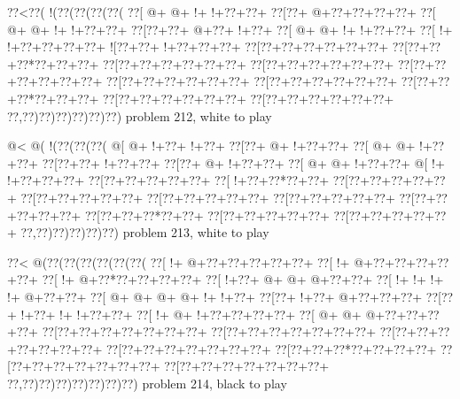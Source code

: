 \vbox{\vbox{\goo
\0??<\0??(\- !(\0??(\0??(\0??(\0??(
\0??[\- @+\- @+\- !+\- !+\0??+\0??+
\0??[\0??+\- @+\0??+\0??+\0??+\0??+
\0??[\- @+\- @+\- !+\- !+\0??+\0??+
\0??[\0??+\0??+\- @+\0??+\- !+\0??+
\0??[\- @+\- @+\- !+\- !+\0??+\0??+
\0??[\- !+\- !+\0??+\0??+\0??+\0??+
\- ![\0??+\0??+\- !+\0??+\0??+\0??+
\0??[\0??+\0??+\0??+\0??+\0??+\0??+
\0??[\0??+\0??+\0??*\0??+\0??+\0??+
\0??[\0??+\0??+\0??+\0??+\0??+\0??+
\0??[\0??+\0??+\0??+\0??+\0??+\0??+
\0??[\0??+\0??+\0??+\0??+\0??+\0??+
\0??[\0??+\0??+\0??+\0??+\0??+\0??+
\0??[\0??+\0??+\0??+\0??+\0??+\0??+
\0??[\0??+\0??+\0??*\0??+\0??+\0??+
\0??[\0??+\0??+\0??+\0??+\0??+\0??+
\0??[\0??+\0??+\0??+\0??+\0??+\0??+
\0??,\0??)\0??)\0??)\0??)\0??)\0??)
}
\hfil problem 212, white to play\hfil\break
}

\vbox{\vbox{\goo
\- @<\- @(\- !(\0??(\0??(\0??(
\- @[\- @+\- !+\0??+\- !+\0??+
\0??[\0??+\- @+\- !+\0??+\0??+
\0??[\- @+\- @+\- !+\0??+\0??+
\0??[\0??+\0??+\- !+\0??+\0??+
\0??[\0??+\- @+\- !+\0??+\0??+
\0??[\- @+\- @+\- !+\0??+\0??+
\- @[\- !+\- !+\0??+\0??+\0??+
\0??[\0??+\0??+\0??+\0??+\0??+
\0??[\- !+\0??+\0??*\0??+\0??+
\0??[\0??+\0??+\0??+\0??+\0??+
\0??[\0??+\0??+\0??+\0??+\0??+
\0??[\0??+\0??+\0??+\0??+\0??+
\0??[\0??+\0??+\0??+\0??+\0??+
\0??[\0??+\0??+\0??+\0??+\0??+
\0??[\0??+\0??+\0??*\0??+\0??+
\0??[\0??+\0??+\0??+\0??+\0??+
\0??[\0??+\0??+\0??+\0??+\0??+
\0??,\0??)\0??)\0??)\0??)\0??)
}
\hfil problem 213, white to play\hfil\break
}

\vbox{\vbox{\goo
\0??<\- @(\0??(\0??(\0??(\0??(\0??(\0??(
\0??[\- !+\- @+\0??+\0??+\0??+\0??+\0??+
\0??[\- !+\- @+\0??+\0??+\0??+\0??+\0??+
\0??[\- !+\- @+\0??*\0??+\0??+\0??+\0??+
\0??[\- !+\0??+\- @+\- @+\- @+\0??+\0??+
\0??[\- !+\- !+\- !+\- !+\- @+\0??+\0??+
\0??[\- @+\- @+\- @+\- @+\- !+\- !+\0??+
\0??[\0??+\- !+\0??+\- @+\0??+\0??+\0??+
\0??[\0??+\- !+\0??+\- !+\- !+\0??+\0??+
\0??[\- !+\- @+\- !+\0??+\0??+\0??+\0??+
\0??[\- @+\- @+\- @+\0??+\0??+\0??+\0??+
\0??[\0??+\0??+\0??+\0??+\0??+\0??+\0??+
\0??[\0??+\0??+\0??+\0??+\0??+\0??+\0??+
\0??[\0??+\0??+\0??+\0??+\0??+\0??+\0??+
\0??[\0??+\0??+\0??+\0??+\0??+\0??+\0??+
\0??[\0??+\0??+\0??*\0??+\0??+\0??+\0??+
\0??[\0??+\0??+\0??+\0??+\0??+\0??+\0??+
\0??[\0??+\0??+\0??+\0??+\0??+\0??+\0??+
\0??,\0??)\0??)\0??)\0??)\0??)\0??)\0??)
}
\hfil problem 214, black to play\hfil\break
}

